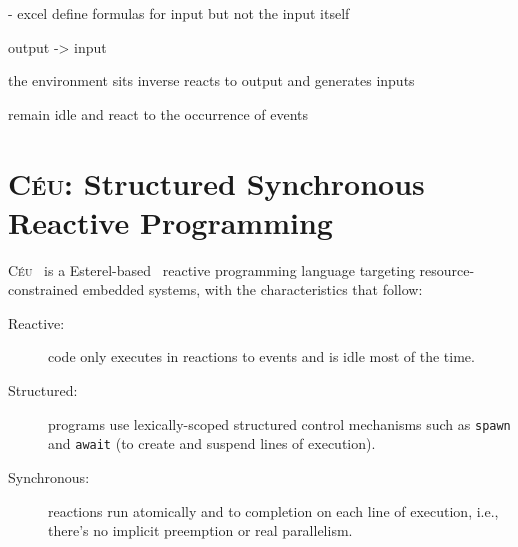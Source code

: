 \documentclass[sigplan,10pt,review,anonymous]{acmart}\settopmatter{printfolios=true,printccs=false,printacmref=false}
\newcommand{\CEU}{\textsc{C\'{e}u}\xspace}
\newcommand{\code}[1] {{\small{\texttt{#1}}}}
\begin{document}

- excel define formulas for input but not the input itself

output -> input

the environment sits
    inverse
    reacts to output and generates inputs

remain idle and react to the occurrence of events 


\section{\CEU: Structured Synchronous Reactive Programming}
\label{sec.ceu}

\CEU~\cite{ceu.sensys13} is a Esterel-based~\cite{ceu.tecs17} reactive
programming language targeting resource-constrained embedded systems, with the
characteristics that follow:
%
\begin{description}
\item [Reactive:] code only executes in reactions to events and is idle most of
    the time.
\item [Structured:] programs use lexically-scoped structured control
    mechanisms such as \code{spawn} and \code{await} (to create and suspend
    lines of execution).
\item [Synchronous:] reactions run atomically and to completion on each line of
    execution, i.e., there's no implicit preemption or real parallelism.
\end{description}
\end{document}
